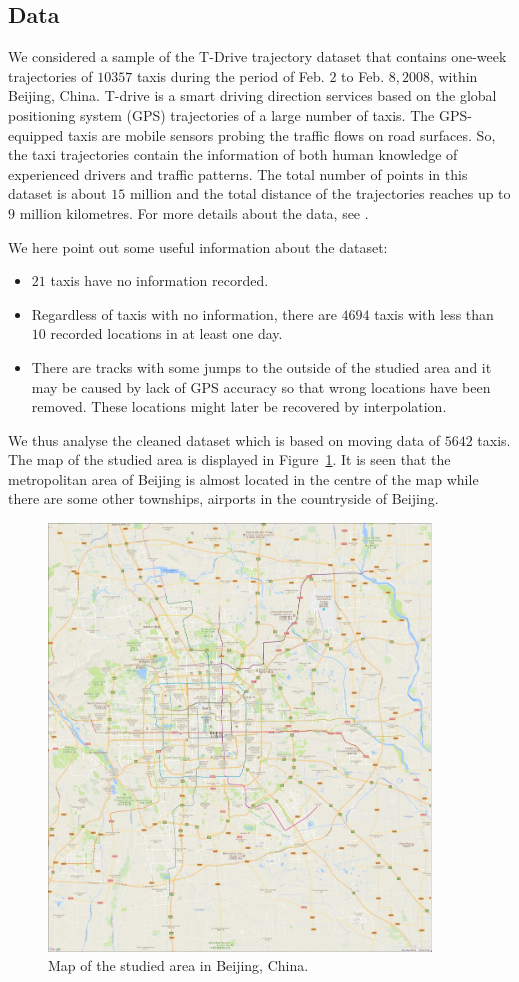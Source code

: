 \documentclass[article]{jss}
\begin{document}
\subsection{Data}
 We considered a sample of the T-Drive trajectory dataset that contains one-week trajectories of $10357$ taxis during the period of Feb. $2$ to Feb. $8, 2008$, within Beijing, China. T-drive is a smart driving direction services based on the global positioning system (GPS) trajectories of a large number of taxis. The GPS-equipped taxis are mobile sensors probing the traffic flows on road surfaces. So, the taxi trajectories contain the information of both human knowledge of experienced drivers and traffic patterns. The total number of points in this dataset is about $15$ million and the total distance of the trajectories reaches up to $9$ million kilometres. For more details about the data, see \cite{yuan10,yuan11}. 
  
We here point out some useful information about the dataset:
\begin{itemize}
  \item $21$ taxis have no information recorded.
  \item Regardless of taxis with no information, there are $4694$ taxis with less than $10$ recorded locations in at least one day. 
  \item There are tracks with some jumps to the outside of the studied area and it may be caused by lack of GPS accuracy so that wrong locations have been removed. These locations might later be recovered by interpolation.
\end{itemize}
  We thus analyse the cleaned dataset which is based on moving data of $5642$ taxis. The map of the studied area is displayed in Figure~\ref{Beijingmapgoogle}. It is seen that the metropolitan area of Beijing is almost located in the centre of the map while there are some other townships, airports in the countryside of Beijing.
  \begin{figure}[!h]
  \centering
  \includegraphics[width = 4in]{Beijingmap}
  \caption{Map of the studied area in Beijing, China.}
  \label{Beijingmapgoogle}
  \end{figure}
  
\end{document}

